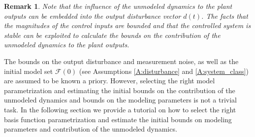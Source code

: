 \documentclass[10 pt, letterpaper]{article}
\newtheorem{remark}{Remark}[section]
\begin{document}
\begin{remark}\label{R:IIR}
Note that the influence of the unmodeled dynamics to the plant outputs can be embedded into the output disturbance vector $d(t)$. The facts that the magnitudes of the control inputs are bounded and that the controlled system is stable can be exploited to calculate the bounds on the contribution of the unmodeled dynamics to the plant outputs. 
\end{remark}
The bounds on the output disturbance and measurement noise, as well as the initial model set $\mathcal{F}(0)$ (see Assumptions  \ref{A:disturbance} and \ref{A:system_class}) are assumed to be known a priory. However, selecting the right model parametrization and estimating the initial bounds on the contribution of the unmodeled dynamics and bounds on the modeling parameters is not a trivial task. In the following section we provide a tutorial on how to select the right basis function parametrization and estimate the initial bounds on modeling parameters and contribution of the unmodeled dynamics.
\end{document}
